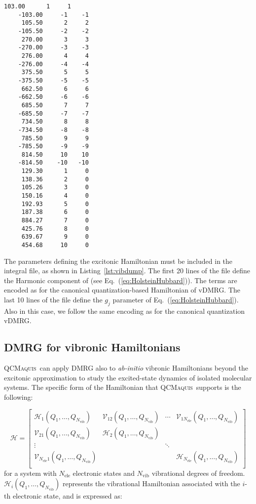 \documentclass[bibliography=totoc,12pt,a4paper]{scrartcl}
\newcommand{\qcm}{\textsc{QCMaquis}}
\begin{document}
\begin{lstlisting}[language=qcmaquis,caption={Excitonic integral file format.},
				   label=lst:excitonicDump]
	 103.00      1     1
	-103.00     -1    -1
	 105.50      2     2
	-105.50     -2    -2
	 270.00      3     3
	-270.00     -3    -3
	 276.00      4     4
	-276.00     -4    -4
	 375.50      5     5
	-375.50     -5    -5
	 662.50      6     6
	-662.50     -6    -6
	 685.50      7     7
	-685.50     -7    -7
	 734.50      8     8
	-734.50     -8    -8
	 785.50      9     9
	-785.50     -9    -9
	 814.50     10    10
	-814.50    -10   -10
	 129.30      1     0
	 138.36      2     0
	 105.26      3     0
	 150.16      4     0
	 192.93      5     0
	 187.38      6     0
	 884.27      7     0
	 425.76      8     0
	 639.67      9     0
	 454.68     10     0
\end{lstlisting}

The parameters defining the excitonic Hamiltonian must be included in the integral file, as shown in Listing~\ref{lst:vibdump}.
The first 20 lines of the file define the Harmonic component of (see Eq.~(\ref{eq:HolsteinHubbard})).
The terms are encoded as for the canonical quantization-based Hamiltonian of vDMRG.
The last 10 lines of the file define the $g_j$ parameter of Eq.~(\ref{eq:HolsteinHubbard}).
Also in this case, we follow the same encoding as for the canonical quantization vDMRG.

\subsection{DMRG for vibronic Hamiltonians}
\label{sec:vibronic}

\qcm\ can apply DMRG also to \textit{ab-initio} vibronic Hamiltonians beyond the excitonic approximation to study the excited-state dynamics of isolated molecular systems.
The specific form of the Hamiltonian that \qcm\ supports is the following:

\begin{equation}
  \mathcal{H} =
    \begin{bmatrix}
	   \mathcal{H}_1(Q_1,\ldots,Q_{N_\text{vib}})
	     & \mathcal{V}_{12}(Q_1,\ldots,Q_{N_\text{vib}}) 
         & \cdots 
		 & \mathcal{V}_{1 N_\text{ele}}(Q_1,\ldots,Q_{N_\text{vib}}) \\
	   \mathcal{V}_{21}(Q_1,\ldots,Q_{N_\text{vib}})
	     & \mathcal{H}_2(Q_1,\ldots,Q_{N_\text{vib}})
         &  
		 & \\
	  \vdots
	     & 
         & \ddots 
		 & \\
	  \mathcal{V}_{N_\text{ele} 1}(Q_1,\ldots,Q_{N_\text{vib}})
	     &
         &  
		 & \mathcal{H}_{N_\text{ele}}(Q_1,\ldots,Q_{N_\text{vib}}) \\
   \end{bmatrix}
  \label{eq:VibronicHamiltonian}
\end{equation}
%
for a system with $N_\text{ele}$ electronic states and $N_\text{vib}$ vibrational degrees of freedom.
$\mathcal{H}_{i}(Q_1,\ldots,Q_{N_\text{vib}})$ represents the vibrational Hamiltonian associated with the $i$-th electronic state, and is expressed as:
\end{document}
